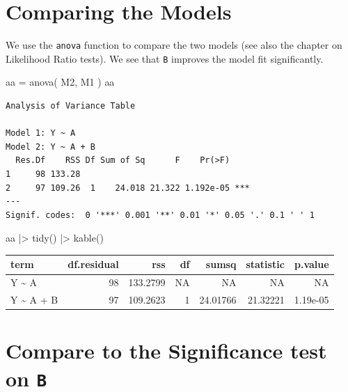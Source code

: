 \documentclass[
  letterpaper,
  DIV=11,
  numbers=noendperiod]{scrreprt}
\newenvironment{Shaded}{\begin{snugshade}}{\end{snugshade}}
\newcommand{\FunctionTok}[1]{\textcolor[rgb]{0.02,0.16,0.49}{#1}}
\newcommand{\NormalTok}[1]{\textcolor[rgb]{0.00,0.44,0.13}{#1}}
\newcommand{\OtherTok}[1]{\textcolor[rgb]{0.00,0.44,0.13}{#1}}
\newcommand{\SpecialCharTok}[1]{\textcolor[rgb]{0.25,0.44,0.63}{#1}}
\begin{document}
\hypertarget{comparing-the-models}{%
\section{Comparing the Models}\label{comparing-the-models}}

We use the \texttt{anova} function to compare the two models (see also
the chapter on Likelihood Ratio tests). We see that \texttt{B} improves
the model fit significantly.

\begin{Shaded}
\begin{Highlighting}[]
\NormalTok{aa }\OtherTok{=} \FunctionTok{anova}\NormalTok{( M2, M1 )}
\NormalTok{aa}
\end{Highlighting}
\end{Shaded}

\begin{verbatim}
Analysis of Variance Table

Model 1: Y ~ A
Model 2: Y ~ A + B
  Res.Df    RSS Df Sum of Sq      F    Pr(>F)    
1     98 133.28                                  
2     97 109.26  1    24.018 21.322 1.192e-05 ***
---
Signif. codes:  0 '***' 0.001 '**' 0.01 '*' 0.05 '.' 0.1 ' ' 1
\end{verbatim}

\begin{Shaded}
\begin{Highlighting}[]
\NormalTok{aa }\SpecialCharTok{|\textgreater{}} 
  \FunctionTok{tidy}\NormalTok{() }\SpecialCharTok{|\textgreater{}} 
  \FunctionTok{kable}\NormalTok{()}
\end{Highlighting}
\end{Shaded}

\begin{longtable}[]{@{}lrrrrrr@{}}
\toprule\noalign{}
term & df.residual & rss & df & sumsq & statistic & p.value \\
\midrule\noalign{}
\endhead
\bottomrule\noalign{}
\endlastfoot
Y \textasciitilde{} A & 98 & 133.2799 & NA & NA & NA & NA \\
Y \textasciitilde{} A + B & 97 & 109.2623 & 1 & 24.01766 & 21.32221 &
1.19e-05 \\
\end{longtable}

\hypertarget{compare-to-the-significance-test-on-b}{%
\section{\texorpdfstring{Compare to the Significance test on
\texttt{B}}{Compare to the Significance test on B}}\label{compare-to-the-significance-test-on-b}}
\end{document}
